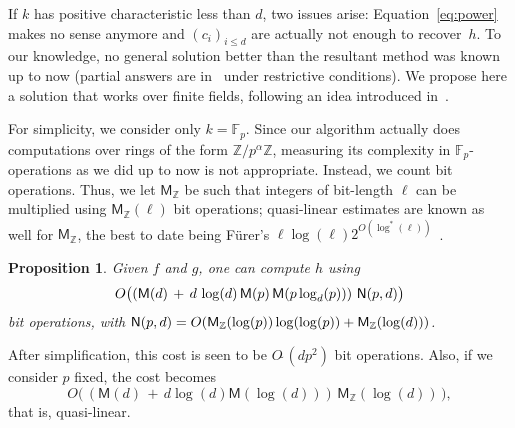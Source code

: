 \documentclass[amsthm]{elsart}
\def\Z {\ensuremath{\mathbb{Z}}}
\def\F {\ensuremath{\mathbb{F}}}
\def\M {\ensuremath{\mathsf{M}}}
\theoremstyle{plain}
\newtheorem{Proposition}{Proposition}
\begin{document}
If $k$ has positive characteristic less than $d$, two issues arise:
Equation~\eqref{eq:power} makes no sense anymore and $(c_i)_{i \le d}$
are actually not enough to recover~$h$. To our knowledge, no general
solution better than the resultant method was known up to now (partial
answers are in~\cite{BoFlSaSc06,Schost05} under restrictive
conditions). We propose here a solution that works over finite fields,
following an idea introduced in~\cite{GoPe04}.

For simplicity, we consider only $k=\F_p$. Since our algorithm
actually does computations over rings of the form $\Z/p^\alpha \Z$,
measuring its complexity in $\F_p$-operations as we did up to now is
not appropriate. Instead, we count bit operations. Thus, we let
$\M_\Z$ be such that integers of bit-length $\ell$ can be multiplied
using $\M_\Z(\ell)$ bit operations; quasi-linear estimates are known
as well for $\M_\Z$, the best to date being F{\"u}rer's $\ell
\log(\ell)2^{O(\log^*(\ell))}$~\cite{Furer07}.

\begin{Proposition}
  Given $f$ and $g$, one can compute $h$ using
$$O\big( (\M(d) \, + \,  d\, \log(d)\, \M(p)\, \M(p\log_d(p))) \ {\sf N}(p,d)\big)$$
  bit operations, with ${\sf N}(p,d)=O(\M_\Z(\log(p))\log(\log(p)) + \M_\Z(\log(d)))$.
\end{Proposition}
\noindent After simplification, this cost is seen to be
$O\tilde{~}(dp^2)$ bit operations. Also, if we consider $p$ fixed, the cost
becomes
$$O\big(\,(\M(d)\,+\, d \log(d)\M(\log(d)))\,\M_\Z(\log(d))\,\big),$$
that is, quasi-linear.
\end{document}

